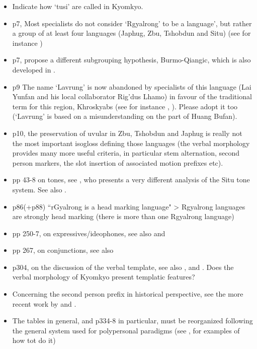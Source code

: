 \documentclass[oldfontcommands,oneside,a4paper,11pt]{article}
\begin{document}
\begin{itemize}
\item Indicate how `tusi' are called in Kyomkyo.
\item p7, Most specialists do not consider `Rgyalrong' to be a  language', but rather a group of at least four languages (Japhug, Zbu, Tshobdun and Situ) (see for instance \citealt[195]{jacques13harmonization})
\item p7, \citet{jacques.michaud11naish} propose a different subgrouping hypothesis, Burmo-Qiangic, which is also developed in \citet{jacques14esquisse}.
\item p9 The name `Lavrung' is now abandoned by specialists of this language (Lai Yunfan and his local collaborator Rig'dus Lhamo) in favour of the traditional term for this region, Khroskyabs (see for instance \citealt{delancey14second}, \citealt{jacques14inverse}). Please adopt it too (`Lavrung' is based on a misunderstanding on the part of Huang Bufan).
\item p10, the preservation of uvular in Zbu, Tshobdun and Japhug is really not the most important isogloss defining those languages (the verbal morphology provides many more useful criteria, in particular stem alternation, second person markers, the slot insertion of associated motion prefixes etc).
\item pp 43-8 on tones, see \citet{linyj12tone}, who presents a very different analysis of the Situ tone system. See also \citet{jackson05yingao.zh}.
\item p86(+p88) ``rGyalrong is a head marking language" > Rgyalrong languages are strongly head marking (there is more than one Rgyalrong language)
\item pp 250-7, on expressives/ideophones, see also \citet{japhug14ideophones} and \citet{jackson14morpho}
\item pp 267, on conjunctions, see also \citet{jacques14linking}
\item p304, on the discussion of the verbal template, see also \citet[197-199]{jacques13harmonization}, \citet[12]{jacques14antipassive} and \citet{lai13affixale}. Does the verbal morphology of Kyomkyo present templatic features?
\item Concerning the second person prefix in historical perspective, see the more recent work by \citet{jacques12agreement} and \citet{delancey14second}.
\item The tables in general, and p334-8 in particular, must be reorganized following the general system used for polypersonal paradigms (see \citet{gongxun14agreement}, \citet{jacques14inverse} for examples of how tot do it)

\end{itemize}
\end{document}
